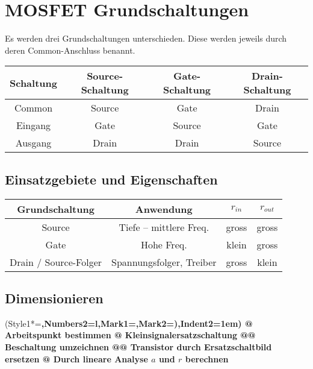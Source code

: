 \section{MOSFET Grundschaltungen}
Es werden drei Grundschaltungen unterschieden. 
Diese werden jeweils durch deren Common-Anschluss benannt.

\begin{center}
    \begingroup{}
    \begin{tabular}{|c|ccc|}
        \hline
        Schaltung   & Source-Schaltung & Gate-Schaltung & Drain-Schaltung \\
        \hline
        Common      & Source    & Gate      & Drain     \\
        Eingang     & Gate      & Source    & Gate      \\
        Ausgang     & Drain     & Drain     & Source    \\
        \hline
    \end{tabular}\endgroup
\end{center}


\subsection{Einsatzgebiete und Eigenschaften}

\begin{center}
    \begingroup{}
    \begin{tabular}{|cccc|}
        \hline
        Grundschaltung          & Anwendung & $r_{in}$ & $r_{out}$ \\
        \hline
        Source                  & Tiefe -- mittlere Freq. & gross & gross \\
        Gate                    & Hohe Freq. & klein & gross \\
        Drain / Source-Folger   & Spannungsfolger, Treiber & gross & klein \\
        \hline
    \end{tabular}\endgroup
\end{center}

\subsection{Dimensionieren}
\begin{easylist}
    \ListProperties(Style1*=\bfseries,Numbers2=l,Mark1={},Mark2={)},Indent2=1em)
    @ Arbeitspunkt bestimmen
    @ Kleinsignalersatzschaltung
    @@ Beschaltung umzeichnen
    @@ Transistor durch Ersatzschaltbild ersetzen
    @ Durch lineare Analyse $a$ und $r$ berechnen
\end{easylist}

